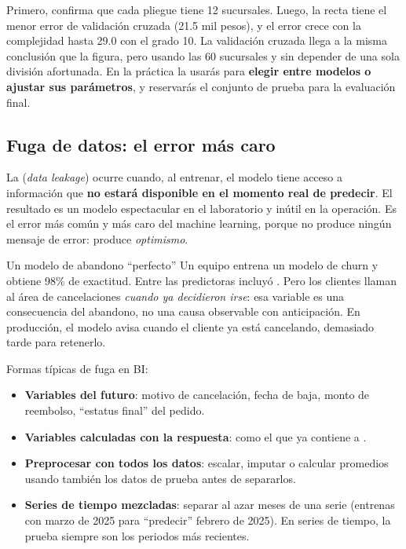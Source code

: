 Primero,  confirma que cada pliegue tiene 12
sucursales. Luego, la recta tiene el menor error de validación cruzada (21.5
mil pesos), y el error crece con la complejidad hasta 29.0 con el grado 10. La
validación cruzada llega a la misma conclusión que la figura, pero usando las
60 sucursales y sin depender de una sola división afortunada. En la práctica
la usarás para \textbf{elegir entre modelos o ajustar sus parámetros}, y
reservarás el conjunto de prueba para la evaluación final.

\subsection{Fuga de datos: el error más caro}
\label{sec:m7-fuga}

La  (\emph{data leakage}) ocurre cuando, al entrenar, el
modelo tiene acceso a información que \textbf{no estará disponible en el
momento real de predecir}. El resultado es un modelo espectacular en el
laboratorio y inútil en la operación. Es el error más común y más caro del
machine learning, porque no produce ningún mensaje de error: produce
\emph{optimismo}.

\begin{negocio}{Un modelo de abandono ``perfecto''}
Un equipo entrena un modelo de churn y obtiene 98\% de exactitud. Entre las
predictoras incluyó .
Pero los clientes llaman al área de cancelaciones \emph{cuando ya decidieron
irse}: esa variable es una consecuencia del abandono, no una causa observable
con anticipación. En producción, el modelo avisa cuando el cliente ya está
cancelando, demasiado tarde para retenerlo.
\end{negocio}

Formas típicas de fuga en BI:

\begin{itemize}
  \item \textbf{Variables del futuro}: motivo de cancelación, fecha de baja,
        monto de reembolso, ``estatus final'' del pedido.
  \item \textbf{Variables calculadas con la respuesta}: como el
         que ya contiene a .
  \item \textbf{Preprocesar con todos los datos}: escalar, imputar o calcular
        promedios usando también los datos de prueba antes de separarlos.
  \item \textbf{Series de tiempo mezcladas}: separar al azar meses de una serie
        (entrenas con marzo de 2025 para ``predecir'' febrero de 2025). En series
        de tiempo, la prueba siempre son los periodos más recientes.
\end{itemize}

